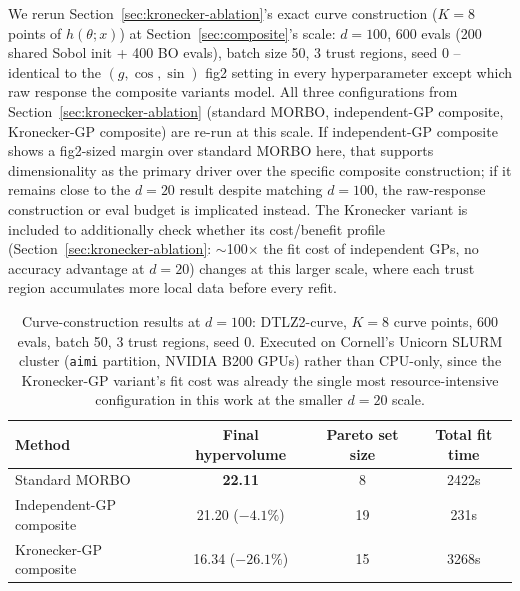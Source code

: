 \documentclass[11pt]{article}
\begin{document}
We rerun Section~\ref{sec:kronecker-ablation}'s exact curve construction
($K=8$ points of $h(\theta;x)$) at Section~\ref{sec:composite}'s scale:
$d=100$, 600 evals (200 shared Sobol init + 400 BO evals), batch size 50, 3
trust regions, seed 0 -- identical to the $(g,\cos,\sin)$ fig2 setting in
every hyperparameter except which raw response the composite variants
model. All three configurations from Section~\ref{sec:kronecker-ablation}
(standard MORBO, independent-GP composite, Kronecker-GP composite) are
re-run at this scale. If independent-GP composite shows a fig2-sized margin
over standard MORBO here, that supports dimensionality as the primary
driver over the specific composite construction; if it remains close to
the $d=20$ result despite matching $d=100$, the raw-response construction
or eval budget is implicated instead. The Kronecker variant is included to
additionally check whether its cost/benefit profile (Section~\ref{sec:kronecker-ablation}:
$\sim$100$\times$ the fit cost of independent GPs, no accuracy advantage at
$d=20$) changes at this larger scale, where each trust region accumulates
more local data before every refit.

\begin{table}[h]
\centering
\caption{Curve-construction results at $d=100$: DTLZ2-curve, $K=8$ curve points, 600 evals, batch 50, 3 trust regions, seed 0. Executed on Cornell's Unicorn SLURM cluster (\texttt{aimi} partition, NVIDIA B200 GPUs) rather than CPU-only, since the Kronecker-GP variant's fit cost was already the single most resource-intensive configuration in this work at the smaller $d=20$ scale.}
\label{tab:curve-100d-results}
\begin{tabular}{lccc}
\toprule
Method & Final hypervolume & Pareto set size & Total fit time \\
\midrule
Standard MORBO & \textbf{22.11} & 8 & 2422s \\
Independent-GP composite & 21.20 ($-4.1\%$) & 19 & 231s \\
Kronecker-GP composite & 16.34 ($-26.1\%$) & 15 & 3268s \\
\bottomrule
\end{tabular}
\end{table}
\end{document}
